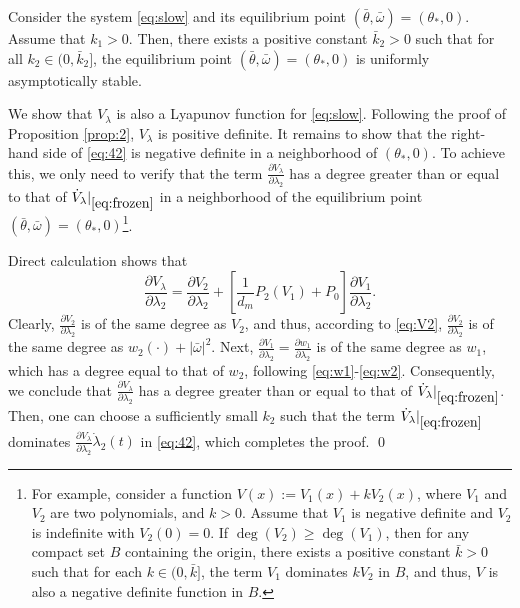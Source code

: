 \documentclass{ifacconf}
\begin{document}
\begin{prop}\label{prop:3}
    Consider the system \eqref{eq:slow} and its equilibrium point \((\bar{\theta}, \bar{\omega}) = (\theta_*, 0)\). Assume that \(k_1 > 0\). Then, there exists a positive constant \(\bar{k}_2 > 0\) such that for all \(k_2 \in (0, \bar{k}_2]\), the equilibrium point \((\bar{\theta}, \bar{\omega}) = (\theta_*, 0)\) is uniformly asymptotically stable.
\end{prop}
\begin{pf}
We show that $V_\lambda$ is also a Lyapunov function for \eqref{eq:slow}. Following the proof of Proposition \ref{prop:2}, \( V_\lambda \) is positive definite. It remains to show that the right-hand side of \eqref{eq:42} is negative definite in a neighborhood of $(\theta_*, 0)$. To achieve this, we only need to verify that the term \( \frac{\partial V_\lambda}{\partial \lambda_2} \) has a degree greater than or equal to that of \( {\dot{V}_\lambda}|_{\eqref{eq:frozen}} \) in a neighborhood of the equilibrium point \((\bar{\theta}, \bar{\omega}) = (\theta_*, 0)\)\footnote{For example, consider a function \( V(x):= V_1(x) + k V_2(x) \), where \( V_1 \) and \( V_2 \) are two polynomials, and \( k > 0 \). Assume that \( V_1 \) is negative definite and \( V_2 \) is indefinite with \( V_2(0) = 0 \). If \( \operatorname{deg}(V_2) \ge \operatorname{deg}(V_1) \), then for any compact set \( B \) containing the origin, there exists a positive constant \( \bar{k} > 0 \) such that for each \( k \in (0, \bar{k}] \), the term \( V_1 \) dominates \( k V_2 \) in \( B \), and thus, \( V \) is also a negative definite function in \( B \).
}.

Direct calculation shows that
\begin{equation}
    \frac{\partial V_\lambda}{\partial \lambda_2}=\frac{\partial V_2}{\partial \lambda_2}+\left[ \frac{1}{d_m}P_2(V_1)+P_0\right]\frac{\partial V_1}{\partial \lambda_2}.
\end{equation}
Clearly, \( \frac{\partial V_2}{\partial \lambda_2} \) is of the same degree as \( V_2 \), and thus, according to \eqref{eq:V2}, \( \frac{\partial V_2}{\partial \lambda_2} \) is of the same degree as \( w_2(\cdot) + |\bar{\omega}|^2 \). Next, $\frac{\partial V_1}{\partial \lambda_2}=\frac{\partial w_1}{\partial \lambda_2}$ is of the same degree as $w_1$, which has a degree equal to that of $w_2$, following \eqref{eq:w1}-\eqref{eq:w2}. Consequently, we conclude that \( \frac{\partial V_\lambda}{\partial \lambda_2} \) has a degree greater than or equal to that of \( {\dot{V}_\lambda}|_{\eqref{eq:frozen}} \). Then, one can choose a sufficiently small $k_2$ such that the term \({\dot{V}_\lambda}|_{\eqref{eq:frozen}}\) dominates $\frac{\partial V_\lambda}{\partial \lambda_2}\dot{\lambda}_2(t)$ in
\eqref{eq:42}, which completes the proof.	\qed
\end{pf}
\end{document}
